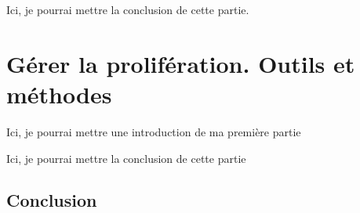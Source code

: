 \documentclass[12pt,twoside]{book}
\begin{document}
	
	
	

	
Ici, je pourrai mettre la conclusion  de cette partie.
	
	
	\part{Gérer la prolifération. Outils et méthodes}
	
	
	
	Ici, je pourrai mettre une introduction de ma première partie
	
	
	
	
	


	Ici, je pourrai mettre la conclusion de cette partie
	
	
\chapter*{Conclusion}
\newpage{\pagestyle{empty}\cleardoublepage}
	








\appendix %
\end{document}
